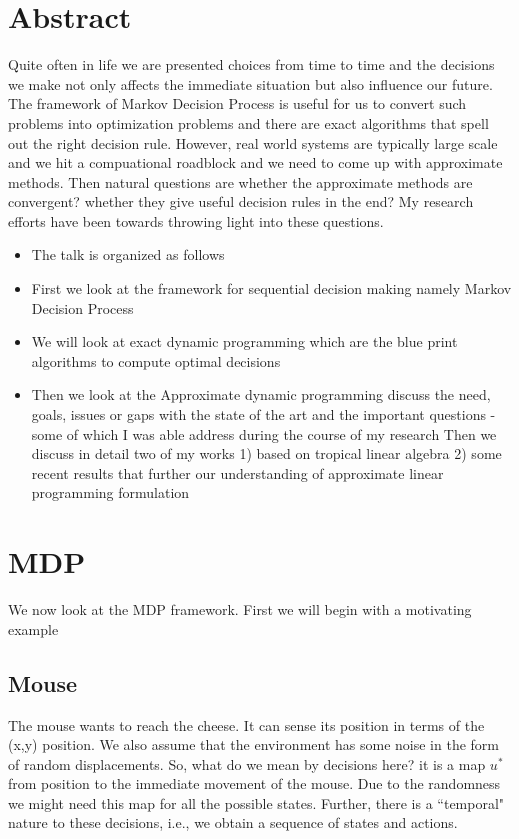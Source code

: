 \documentclass{article}
\begin{document}
\onecolumn
{}
\section{Abstract}
Quite often in life we are presented choices from time to time and the decisions we make not only affects the immediate situation but also influence our future. The framework of Markov Decision Process is useful for us to convert such problems into optimization problems and there are exact algorithms that spell out the right decision rule. However, real world systems are typically large scale and we hit a compuational roadblock and we need to come up with approximate methods. Then natural questions are whether the approximate methods are convergent? whether they give useful decision rules in the end? My research efforts have been towards throwing light into these questions.
\begin{itemize}
\item The talk is organized as follows
\item First we look at the framework for sequential decision making namely Markov Decision Process
\item We will look at exact dynamic programming which are the blue print algorithms to compute optimal decisions
\item Then we look at the  Approximate dynamic programming discuss the need, goals, issues or gaps with the state of the art and the important questions -some of which I was able address during the course of my research
Then we discuss in detail two of my works
1) based on tropical linear algebra
2) some recent results that further our understanding of approximate linear programming formulation
\end{itemize}

\section{MDP}
We now look at the MDP framework. First we will begin with a motivating example
\subsection{Mouse}
The mouse wants to reach the cheese. It can sense its position in terms of the (x,y) position. We also assume that the environment has some noise in the form of random displacements.
So, what do we mean by decisions here? it is a map $u^*$ from position to the immediate movement of the mouse. Due to the randomness we might need this map for all the possible states. Further, there is a ``temporal" nature to these decisions, i.e., we obtain a sequence of states and actions.
\end{document}
